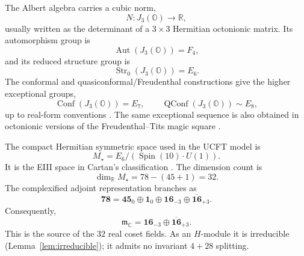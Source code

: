 \documentclass[aps,prd,preprint,longbibliography,nofootinbib,superscriptaddress,floatfix]{revtex4-2}
\newcommand{\Spin}{\operatorname{Spin}}
\newcommand{\Aut}{\operatorname{Aut}}
\newcommand{\Str}{\operatorname{Str}}
\newcommand{\Conf}{\operatorname{Conf}}
\newcommand{\QConf}{\operatorname{QConf}}
\begin{document}
The Albert algebra carries a cubic norm,
\begin{equation}
    N:J_3(\mathbb O)\to\mathbb R,
    \label{eq:app_cubic_norm}
\end{equation}
usually written as the determinant of a \(3\times3\) Hermitian octonionic
matrix. Its automorphism group is
\begin{equation}
    \Aut(J_3(\mathbb O))=F_4,
    \label{eq:app_f4}
\end{equation}
and its reduced structure group is
\begin{equation}
    \Str_0(J_3(\mathbb O))=E_6.
    \label{eq:app_e6}
\end{equation}
The conformal and quasiconformal/Freudenthal constructions give the higher
exceptional groups,
\begin{equation}
    \Conf(J_3(\mathbb O))=E_7,
    \qquad
    \QConf(J_3(\mathbb O))\sim E_8,
    \label{eq:app_e7_e8}
\end{equation}
up to real-form conventions \cite{Freudenthal,SpringerVeldkamp}. The same
exceptional sequence is also obtained in octonionic versions of the
Freudenthal--Tits magic square \cite{TitsMagicSquare,AdamsLectures,
BartonSudbery}.

The compact Hermitian symmetric space used in the UCFT model is
\begin{equation}
    M_\star
    =
    E_6/(\Spin(10)\cdot U(1)).
    \label{eq:app_eiii}
\end{equation}
It is the EIII space in Cartan's classification \cite{Helgason,Besse}. The
dimension count is
\begin{equation}
    \dim_{\mathbb R}M_\star
    =
    78-(45+1)
    =
    32 .
    \label{eq:app_eiii_dimension}
\end{equation}
The complexified adjoint representation branches as
\begin{equation}
    \mathbf{78}
    =
    \mathbf{45}_{0}
    \oplus
    \mathbf{1}_{0}
    \oplus
    \mathbf{16}_{-3}
    \oplus
    \overline{\mathbf{16}}_{+3}.
    \label{eq:app_adjoint_branching}
\end{equation}
Consequently,
\begin{equation}
    \mathfrak m_{\mathbb C}
    =
    \mathbf{16}_{-3}
    \oplus
    \overline{\mathbf{16}}_{+3}.
    \label{eq:app_eiii_tangent}
\end{equation}
This is the source of the \(32\) real coset fields. As an \(H\)-module it is
irreducible (Lemma~\ref{lem:irreducible}); it admits no invariant \(4+28\)
splitting.
\end{document}
